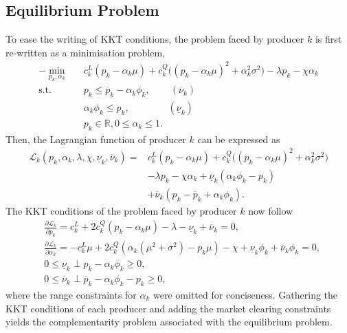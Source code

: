 \documentclass{article}
\begin{document}
\subsection*{Equilibrium Problem}
To ease the writing of KKT conditions, the problem faced by producer $k$ is first re-written as a minimisation problem,
\begin{align}
-\underset{p_k, \alpha_k}{\min} \hspace{10pt} & c_k^L(p_k - \alpha_k \mu) + c_k^Q \big((p_k - \alpha_k \mu)^2 + \alpha_k^2 \sigma^2\big) - \lambda p_k - \chi \alpha_k\\
\mbox{s.t. } & p_k \le \overline{p}_k - \alpha_k \phi_k, \hspace{25pt} (\overline{\nu}_k)\\
& \alpha_k \phi_k \le p_k, \hspace{48pt}(\underline{\nu}_k)\\
&p_k \in \mathbb{R}, 0 \le \alpha_k \le 1.
\end{align}
Then, the Lagrangian function of producer $k$ can be expressed as
\begin{align*}
\mathcal{L}_k(p_k, \alpha_k, \lambda, \chi, \underline{\nu}_k, \overline{\nu}_k) =& c_k^L(p_k - \alpha_k \mu) + c_k^Q \big((p_k - \alpha_k \mu)^2 + \alpha_k^2 \sigma^2\big)\\
&- \lambda p_k - \chi \alpha_k + \underline{\nu}_k(\alpha_k \phi_k - p_k)\\
&+ \overline{\nu}_k (p_k - \overline{p}_k + \alpha_k \phi_k).
\end{align*}
The KKT conditions of the problem faced by producer $k$ now follow
\begin{align*}
&\frac{\partial \mathcal{L}_k}{\partial p_k} = c_k^L + 2 c_k^Q (p_k - \alpha_k \mu) - \lambda - \underline{\nu}_k + \overline{\nu}_k = 0,\\
&\frac{\partial \mathcal{L}_k}{\partial \alpha_k} = - c_k^L \mu + 2 c_k^Q(\alpha_k(\mu^2 + \sigma^2) - p_k \mu) - \chi + \underline{\nu}_k \phi_k + \overline{\nu}_k \phi_k = 0,\\
&0 \le \underline{\nu}_k \perp p_k - \alpha_k \phi_k \ge 0,\\
&0 \le \overline{\nu}_k \perp \overline{p}_k - \alpha_k \phi_k - p_k \ge 0,
\end{align*}
where the range constraints for $\alpha_k$ were omitted for conciseness. Gathering the KKT conditions of each producer and adding the market clearing constraints yields the complementarity problem associated with the equilibrium problem.
\end{document}
